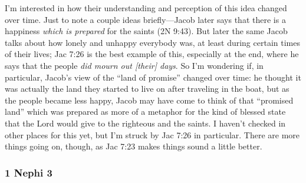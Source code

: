 		\begin{compactdesc}

		\item[20$\vert$]
		\begin{compactdesc}
		\item[A land of promise...which I have prepared for you] I'm interested in how their understanding and perception of this idea changed over time. Just to note a couple ideas briefly---Jacob later says that there is a happiness \textit{which is prepared} for the saints (2N 9:43). But later the same Jacob talks about how lonely and unhappy everybody was, at least during certain times of their lives; Jac 7:26 is the best example of this, especially at the end, where he says that the people \textit{did mourn out [their] days}. So I'm wondering if, in particular, Jacob's view of the ``land of promise'' changed over time: he thought it was actually the land they started to live on after traveling in the boat, but as the people became less happy, Jacob may have come to think of that ``promised land'' which was prepared as more of a metaphor for the kind of blessed state that the Lord would give to the righteous and the saints. I haven't checked in other places for this yet, but I'm struck by Jac 7:26 in particular. There are more things going on, though, as Jac 7:23 makes things sound a little better.
		\end{compactdesc}

		\end{compactdesc}
		
	\subsubsection{1 Nephi 3} %
	
